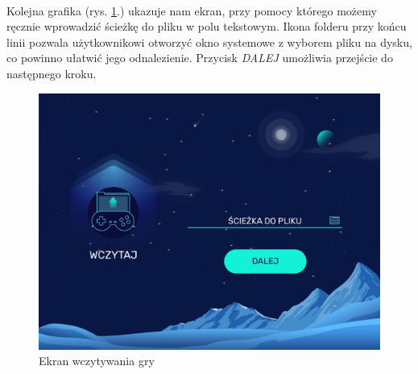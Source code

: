 \documentclass[a4paper]{article}
\begin{document}
\newpage

\paragraph{}Kolejna grafika (rys. \ref{fig:wczytaj}.) ukazuje nam ekran, przy pomocy którego możemy ręcznie wprowadzić ścieżkę do pliku w polu tekstowym. Ikona folderu przy końcu linii pozwala użytkownikowi otworzyć okno systemowe z wyborem pliku na dysku, co powinno ułatwić jego odnalezienie. Przycisk \textit{DALEJ} umożliwia przejście do następnego kroku.
\begin{figure}[H]
    \centering
    \includegraphics[width=1\textwidth]{img/ekran-wczytaj.png}
    \caption{Ekran wczytywania gry}
    \label{fig:wczytaj}
\end{figure}

\newpage
\end{document}
